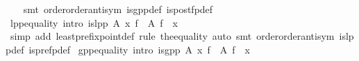 \begin{isabellebody}
%
\isadelimproof
\ \ %
\endisadelimproof
%
\isatagproof
{}\isamarkupfalse%
\ {}smt\ order{}order{}antisym\ is{}gpp{}def\ is{}post{}fp{}def{}%
\endisatagproof
{\isafoldproof}%
%
\isadelimproof
\isanewline
%
\endisadelimproof
\isanewline
{}\isamarkupfalse%
\ lpp{}equality\ {}intro{}{}{}\ {}is{}lpp\ A\ x\ f\ {}\ {}A\isactrlesub \ f\ {}\ x{}\isanewline
%
\isadelimproof
\ \ %
\endisadelimproof
%
\isatagproof
{}\isamarkupfalse%
\ {}simp\ add{}\ least{}prefix{}point{}def{}\ rule\ the{}equality{}\ auto{}\ smt\ order{}order{}antisym\ is{}lpp{}def\ is{}pre{}fp{}def{}%
\endisatagproof
{\isafoldproof}%
%
\isadelimproof
\isanewline
%
\endisadelimproof
\isanewline
{}\isamarkupfalse%
\ gpp{}equality\ {}intro{}{}{}\ {}is{}gpp\ A\ x\ f\ {}\ {}A\isactrlesub \ f\ {}\ x{}\isanewline

\end{isabellebody}
